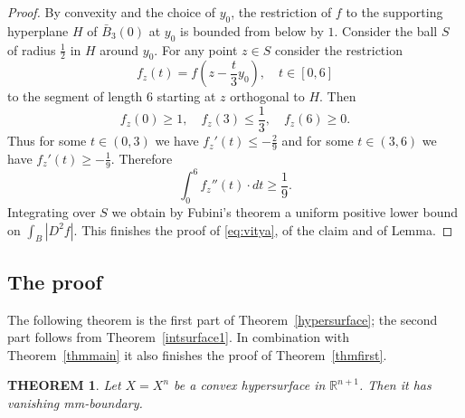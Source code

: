 \documentclass[12pt,leqno,intlimits]{amsart}
\numberwithin{equation}{section}
\newtheorem{thm}{THEOREM}[section]
\theoremstyle{definition}
\theoremstyle{remark}
\newcommand{\tref}[1]{Theorem~\ref{#1}}
\newcommand{\R}{\mathbb{R}}
\begin{document}
\begin{proof}
By convexity and the choice of $y_0$, the restriction of $f$ to the supporting hyperplane $H$ of $\bar B_3(0)$ at $y_0$ is bounded from below by $1$. Consider the ball $S$ of radius $\frac 1 2$ in $H$ around $y_0$. For any point $z\in S$ consider the restriction
$$f_z (t)= f(z- \frac t 3 y_0 ),\quad t\in [0,6]$$
to the segment of length $6$ starting at $z$ orthogonal to $H$.
Then 
$$f_z(0)\geq 1,\quad 
f_z (3)\leq \frac 1 3,\quad
f_z (6) \geq 0.$$
Thus for some $t\in (0,3)$ we have $f_z'(t) \leq -\frac 2 9$ and for some $t\in (3,6)$ we have $f_z'(t) \geq - \frac 1 9$.
Therefore
$$\int _0 ^6 f_z'' (t)\cdot dt \geq \frac 1 9.$$
Integrating over $S$ we obtain by Fubini's theorem a uniform positive lower bound on $\int _{B} |D^2f|$.
This finishes the proof of \eqref{eq:vitya}, of the claim and of Lemma.
\end{proof}

\subsection{The proof} The following theorem is the first part of \tref{hypersurface};
the second part follows from \tref{intsurface1}.
In combination with \tref{thmmain} it also finishes the proof of \tref{thmfirst}. %

\begin{thm} \label{thmconv}
Let $X=X^n$ be a convex hypersurface in $\R^{n+1}$.
Then it has vanishing  mm-boundary.

\end{thm}
\end{document}
